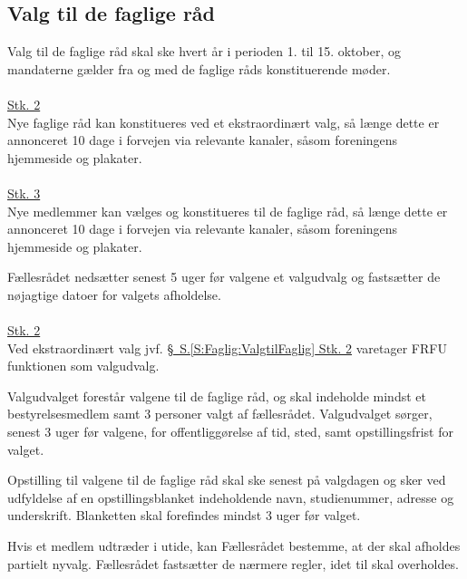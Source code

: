 \begin{list}
\subsection{Valg til de faglige råd}
\label{S:kap:valgtilfagligraad}
\item \label{S:Faglig:ValgtilFaglig} Valg til de faglige råd skal ske hvert år i perioden 1. til 15. oktober, og mandaterne gælder fra og med de faglige råds konstituerende møder.\\
\\
\underline{Stk. 2} \\
Nye faglige råd kan konstitueres ved et ekstraordinært valg, så længe dette er annonceret 10 dage i forvejen via relevante kanaler, såsom foreningens hjemmeside og plakater.\\
\\
\underline{Stk. 3} \\
Nye medlemmer kan vælges og konstitueres til de faglige råd, så længe dette er annonceret 10 dage i forvejen via relevante kanaler, såsom foreningens hjemmeside og plakater.\\

\item \label{S:Faglig:Valgudvalg} Fællesrådet nedsætter senest 5 uger før valgene et valgudvalg og fastsætter de nøjagtige datoer for valgets afholdelse.\\
\\
\underline{Stk. 2}\\
Ved ekstraordinært valg jvf. \hyperref[S:Faglig:ValgtilFaglig]{\S \ S.\ref*{S:Faglig:ValgtilFaglig} Stk. 2} varetager FRFU funktionen som valgudvalg.\\

\item Valgudvalget forestår valgene til de faglige råd, og skal indeholde mindst et bestyrelsesmedlem samt 3 personer valgt af fællesrådet. Valgudvalget sørger, senest 3 uger før valgene, for offentliggørelse af tid, sted, samt opstillingsfrist for valget.

\item \label{S:Faglig:Blanket} Opstilling til valgene til de faglige råd skal ske senest på valgdagen og sker ved udfyldelse af en opstillingsblanket indeholdende navn, studienummer, adresse og underskrift. Blanketten skal forefindes mindst 3 uger før valget.

\item Hvis et medlem udtræder i utide, kan Fællesrådet bestemme, at der skal afholdes partielt nyvalg. Fællesrådet fastsætter de nærmere regler, idet  til  skal overholdes.\\


\end{list}
